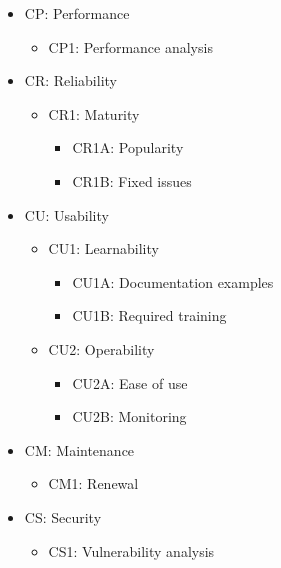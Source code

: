 \begin{itemize}
    \item	CP: Performance
          \begin{itemize}
              \item	CP1: Performance analysis
          \end{itemize}
    \item	CR: Reliability
          \begin{itemize}
              \item	CR1: Maturity
                    \begin{itemize}
                        \item	CR1A: Popularity
                        \item	CR1B: Fixed issues
                    \end{itemize}
          \end{itemize}
    \item	CU: Usability
          \begin{itemize}
              \item	CU1: Learnability
                    \begin{itemize}
                        \item	CU1A: Documentation examples
                        \item	CU1B: Required training
                    \end{itemize}

              \item  CU2: Operability
                    \begin{itemize}
                        \item	CU2A: Ease of use
                        \item	CU2B: Monitoring
                    \end{itemize}
          \end{itemize}
    \item	CM: Maintenance
          \begin{itemize}
              \item	CM1: Renewal
          \end{itemize}
    \item	CS: Security
          \begin{itemize}
              \item	CS1: Vulnerability analysis
          \end{itemize}
\end{itemize}


